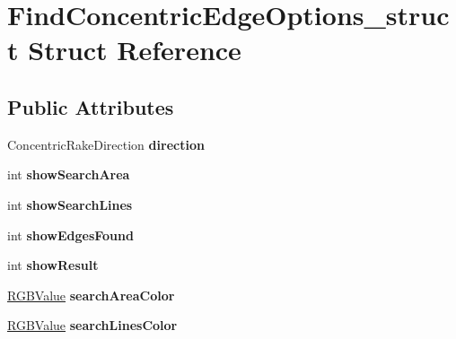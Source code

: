 \hypertarget{structFindConcentricEdgeOptions__struct}{
\section{FindConcentricEdgeOptions\_\-struct Struct Reference}
\label{structFindConcentricEdgeOptions__struct}
}
\subsection*{Public Attributes}
\begin{DoxyCompactItemize}
\item 
\hypertarget{structFindConcentricEdgeOptions__struct_aaefa363dcec3579d605a970f8853ab7f}{
ConcentricRakeDirection {\bfseries direction}}
\label{structFindConcentricEdgeOptions__struct_aaefa363dcec3579d605a970f8853ab7f}

\item 
\hypertarget{structFindConcentricEdgeOptions__struct_a9890b9072847438019c30b237cf187a8}{
int {\bfseries showSearchArea}}
\label{structFindConcentricEdgeOptions__struct_a9890b9072847438019c30b237cf187a8}

\item 
\hypertarget{structFindConcentricEdgeOptions__struct_a8a08bbab4606c8b9e11f41e0029df761}{
int {\bfseries showSearchLines}}
\label{structFindConcentricEdgeOptions__struct_a8a08bbab4606c8b9e11f41e0029df761}

\item 
\hypertarget{structFindConcentricEdgeOptions__struct_a30dbe7fc3815f6f5f32de490be5c4697}{
int {\bfseries showEdgesFound}}
\label{structFindConcentricEdgeOptions__struct_a30dbe7fc3815f6f5f32de490be5c4697}

\item 
\hypertarget{structFindConcentricEdgeOptions__struct_a80668069c055902d5cc94971d5560fb8}{
int {\bfseries showResult}}
\label{structFindConcentricEdgeOptions__struct_a80668069c055902d5cc94971d5560fb8}

\item 
\hypertarget{structFindConcentricEdgeOptions__struct_afa268a7d2706827d0f13e9d45ddeac32}{
\hyperlink{structRGBValue__struct}{RGBValue} {\bfseries searchAreaColor}}
\label{structFindConcentricEdgeOptions__struct_afa268a7d2706827d0f13e9d45ddeac32}

\item 
\hypertarget{structFindConcentricEdgeOptions__struct_a15d9876e9d08c732711beee9d71d3eba}{
\hyperlink{structRGBValue__struct}{RGBValue} {\bfseries searchLinesColor}}
\label{structFindConcentricEdgeOptions__struct_a15d9876e9d08c732711beee9d71d3eba}


\end{DoxyCompactItemize}
